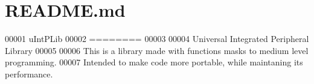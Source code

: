 \hypertarget{_r_e_a_d_m_e_8md_source}{\section{R\-E\-A\-D\-M\-E.\-md}
}

\begin{DoxyCode}
00001 uIntPLib
00002 ========
00003 
00004 Universal Integrated Peripheral Library
00005 
00006 This is a library made with functions masks to medium level programming.
00007 Intended to make code more portable, \textcolor{keywordflow}{while} maintaning its performance.
\end{DoxyCode}
